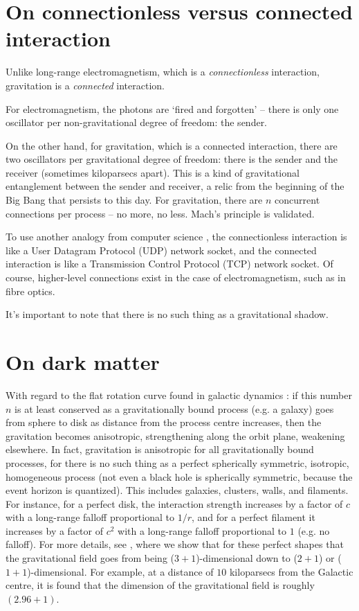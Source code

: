 \documentclass[12pt]{article}
\begin{document}
\section{On connectionless versus connected interaction}

Unlike long-range electromagnetism, which is a {\textit{connectionless}} interaction, gravitation is a {\textit{connected}} interaction.

For electromagnetism, the photons are `fired and forgotten' -- there is only one oscillator per non-gravitational degree of freedom: the sender.

On the other hand, for gravitation, which is a connected interaction, there are two oscillators per gravitational degree of freedom: there is the sender and the receiver (sometimes kiloparsecs apart).
This is a kind of gravitational entanglement between the sender and receiver, a relic from the beginning of the Big Bang that persists to this day.
For gravitation, there are $n$ concurrent connections per process -- no more, no less.
Mach's principle \cite{misner} is validated.

To use another analogy from computer science \cite{stevens}, the connectionless interaction is like a User Datagram Protocol (UDP) network socket, and the connected interaction is like a Transmission Control Protocol (TCP) network socket.
Of course, higher-level connections exist in the case of electromagnetism, such as in fibre optics.

It's important to note that there is no such thing as a gravitational shadow.




\section{On dark matter}

With regard to the flat rotation curve found in galactic dynamics \cite{binney}: if this number $n$ is at least conserved as a gravitationally bound process (e.g. a galaxy) goes from sphere to disk as distance from the process centre increases, then the gravitation becomes anisotropic, strengthening along the orbit plane, weakening elsewhere.
In fact, gravitation is anisotropic for all gravitationally bound processes, for there is no such thing as a perfect spherically symmetric, isotropic, homogeneous process (not even a black hole is spherically symmetric, because the event horizon is quantized).
This includes galaxies, clusters, walls, and filaments.
For instance, for a perfect disk, the interaction strength increases by a factor of $c$ with a long-range falloff proportional to $1/r$, and for a perfect filament it increases by a factor of $c^2$ with a long-range falloff proportional to $1$ (e.g. no falloff).
For more details, see \cite{halayka}, where we show that for these perfect shapes that the gravitational field goes from being ($3+1$)-dimensional down to ($2+1$) or ($1+1$)-dimensional.
For example, at a distance of $10$ kiloparsecs from the Galactic centre, it is found that the dimension of the gravitational field is roughly $(2.96 + 1)$.
\end{document}
